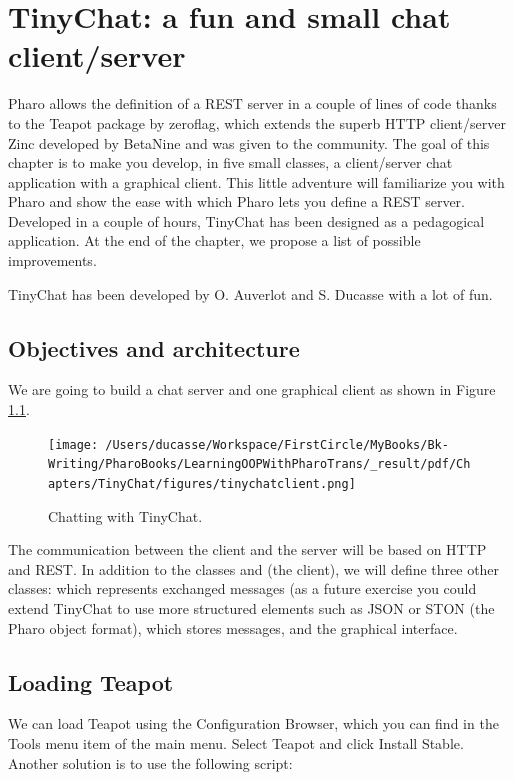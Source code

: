 \documentclass[10pt,twoside,english]{_support/latex/sbabook/sbabook}
\begin{document}
\frontmatter
\pagestyle{plain}

\tableofcontents*
\clearpage\listoffigures

\mainmatter

\chapter{TinyChat: a fun and small chat client/server}
Pharo allows the definition of a REST server in a couple of lines of code thanks to the Teapot package by zeroflag, which extends the superb HTTP client/server Zinc developed by BetaNine and was given to the community. 
The goal of this chapter is to make you develop, in five small classes, a client/server chat application with a graphical client.
This little adventure will familiarize you with Pharo and show the ease with which Pharo lets you define a REST server.
Developed in a couple of hours, TinyChat has been designed as a pedagogical application. At the end of the chapter, we propose a list of possible improvements. 

TinyChat has been developed by O. Auverlot and S. Ducasse with a lot of fun. 
\section{Objectives and architecture}
We are going to build a chat server and one graphical client as shown in Figure \ref{tinychatclient}. 


\begin{figure}

\begin{center}
\texttt{[image: /Users/ducasse/Workspace/FirstCircle/MyBooks/Bk-Writing/PharoBooks/LearningOOPWithPharoTrans/\_result/pdf/Chapters/TinyChat/figures/tinychatclient.png]}\caption{Chatting with TinyChat.\label{tinychatclient}}\end{center}
\end{figure}


The communication between the client and the server will be based on HTTP and REST.
In addition to the classes  and  (the client), we will define three other classes: 
 which represents exchanged messages (as a future exercise you could extend TinyChat to use 
more structured elements such as JSON or STON (the Pharo object format),  which stores
messages, and  the graphical interface.
\section{Loading Teapot}
We can load Teapot using the Configuration Browser, which you can find in the Tools menu item of the main menu.
Select Teapot and click Install Stable. Another solution is to use the following script:
\end{document}
